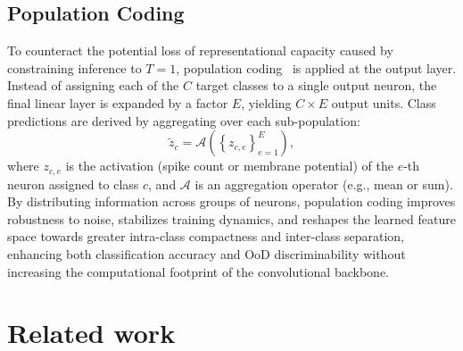 \documentclass{ieeeaccess}
\begin{document}
\subsection{Population Coding}

To counteract the potential loss of representational capacity caused by constraining inference to $T=1$, population coding~\cite{eliasmith2003neural} is applied at the output layer. Instead of assigning each of the $C$ target classes to a single output neuron, the final linear layer is expanded by a factor $E$, yielding $C \times E$ output units. Class predictions are derived by aggregating over each sub-population:
\begin{equation}
\label{eq:popcoding}
\tilde{z}_c = \mathcal{A}\!\left(\left\{ z_{c,e} \right\}_{e=1}^{E}\right),
\end{equation}
where $z_{c,e}$ is the activation (spike count or membrane potential) of the $e$-th neuron assigned to class $c$, and $\mathcal{A}$ is an aggregation operator (e.g., mean or sum). By distributing information across groups of neurons, population coding improves robustness to noise, stabilizes training dynamics, and reshapes the learned feature space towards greater intra-class compactness and inter-class separation, enhancing both classification accuracy and OoD discriminability without increasing the computational footprint of the convolutional backbone.


\section{Related work}
\label{sec:related}
\end{document}
